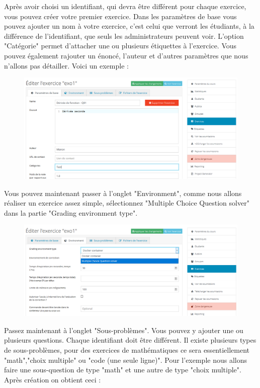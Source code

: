 \documentclass{article}
\begin{document}
Après avoir choisi un identifiant, qui devra être différent pour chaque exercice, vous pouvez créer votre premier exercice.
Dans les paramètres de base vous pouvez ajouter un nom à votre exercice, c'est celui que verront les étudiants, à la différence de l'identifiant, que seuls les administrateurs peuvent voir.  L'option "Catégorie" permet d'attacher une ou plusieurs étiquettes à l'exercice. Vous pouvez également rajouter un énoncé, l'auteur et d'autres paramètres que nous n'allons pas détailler. Voici un exemple :

\begin{figure}[!htb]
    \centering
    \includegraphics[scale=0.4]{images/Para.PNG}
\end{figure}

\newpage
Vous pouvez maintenant passer à l'onglet "Environment", comme nous allons réaliser un exercice assez simple, sélectionnez "Multiple Choice Question solver" dans la partie "Grading environment type". 

\begin{figure}[!htb]
    \centering
    \includegraphics[scale=0.49]{images/Envi.png}
\end{figure}

Passez maintenant à l'onglet "Sous-problèmes". Vous pouvez y ajouter une ou plusieurs questions. Chaque identifiant doit être différent. Il existe plusieurs types de sous-problèmes, pour des exercices de mathématiques ce sera essentiellement "math","choix multiple" ou "code (une seule ligne)". Pour l'exemple nous allons faire une sous-question de type "math" et une autre de type "choix multiple". Après création on obtient ceci :
\end{document}
